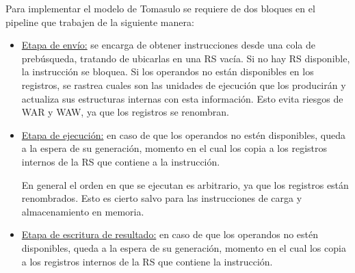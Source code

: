 Para implementar el modelo de Tomasulo se requiere de dos bloques en el pipeline que trabajen de la siguiente manera:

\begin{itemize}
 \item \underline{Etapa de env\'io:} se encarga de obtener instrucciones desde una cola de preb\'usqueda, tratando de ubicarlas en una RS vac\'ia.
 Si no hay RS disponible, la instrucci\'on se bloquea. Si los operandos no est\'an disponibles en los registros, se rastrea cuales son las unidades de
 ejecuci\'on que los producir\'an y actualiza sus estructuras internas con esta informaci\'on. Esto evita riesgos de WAR y WAW, ya que los registros se renombran.
  
 \item \underline{Etapa de ejecuci\'on:} en caso de que los operandos no est\'en disponibles, queda a la espera de su generaci\'on, momento en el cual
 los copia a los registros internos de la RS que contiene a la instrucci\'on.
 
 En general el orden en que se ejecutan es arbitrario, ya que los registros est\'an renombrados. Esto es cierto salvo para las instrucciones de carga y
 almacenamiento en memoria.
 
 \item \underline{Etapa de escritura de resultado:} en caso de que los operandos no est\'en disponibles, queda a la espera de su generaci\'on, momento en el
 cual los copia a los registros internos de la RS que contiene la instrucci\'on.
 
\end{itemize}





